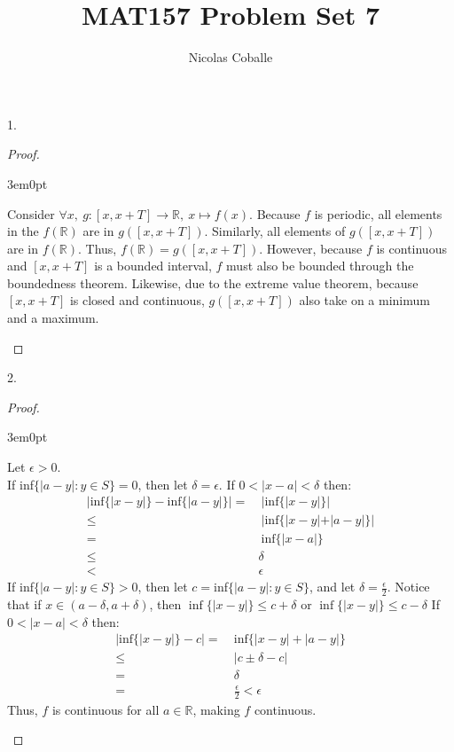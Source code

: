 \documentclass[11pt]{article}
\title{MAT157 Problem Set 7}
\author{Nicolas Coballe}
\newcommand{\R}{\mathbb{R}}
\newenvironment{myproof}
{\begin{proof} \begin{adjustwidth}{3em}{0pt}$ $\par\nobreak\ignorespaces}
{\end{adjustwidth} \end{proof}}
\begin{document}
\maketitle
\begin{flushleft}

1.

\begin{myproof}

Consider $\forall x, \ g: [x,x+T] \rightarrow \R, \ x \mapsto f(x)$. Because $f$ is periodic, all elements in the $f(\R)$ are in $g([x,x+T])$. Similarly, all elements of $g([x,x+T])$ are in $f(\R)$. Thus, $f(\R) = g([x,x+T])$. However, because $f$ is continuous and $[x,x+T]$ is a bounded interval, $f$ must also be bounded through the boundedness theorem. Likewise, due to the extreme value theorem, because $[x,x+T]$ is closed and continuous, $g([x,x+T])$ also take on a minimum and a maximum.

\end{myproof}

\newpage

2. \begin{myproof}

Let $\epsilon > 0$.\\
\bigskip
If inf$\{|a-y|: y \in S\} = 0$, then let $\delta = \epsilon$. If $ 0 < |x-a| < \delta$ then:
\begin{align*}
|\text{inf}\{|x-y|\} - \text{inf}\{|a-y|\}| = & \ |\text{inf}\{|x-y|\}| \\
\leq & \ |\text{inf}\{|x-y| + |a-y|\}| \\
= & \ \text{inf}\{|x-a|\} \\
\leq & \delta \\
< & \epsilon
\end{align*}
If inf$\{|a-y|: y \in S\} > 0$, then let $c =$inf$\{|a-y|: y \in S\}$, and let $\delta = \frac{\epsilon}{2}$. Notice that if $x \in (a- \delta, a + \delta)$, then $\inf\{|x-y|\} \leq c + \delta$ or $\inf\{|x-y|\} \leq c - \delta$ If $ 0 < |x-a| < \delta$ then:
\begin{align*}
|\text{inf}\{|x-y|\} - c| = & \ \text{inf}\{|x-y| + |a-y|\} \\
\leq & \ |c \pm \delta - c| \\
= & \ \delta \\
= & \ \frac{\epsilon}{2} < \epsilon
\end{align*}
Thus, $f$ is continuous for all $a \in \R$, making $f$ continuous.
\end{myproof}

\newpage


\end{flushleft}
\end{document}
